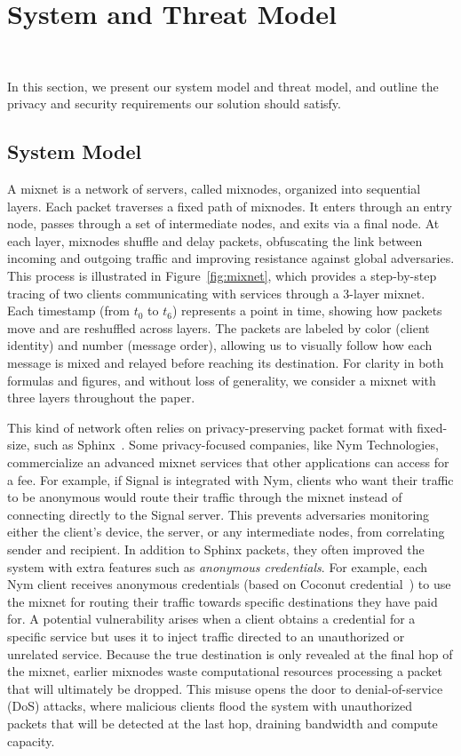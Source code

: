 \section{System and Threat Model}~\label{sec:sys_model}

In this section, we present our system model and threat model, and outline the privacy and security requirements our solution should satisfy.

\subsection{System Model}

A mixnet is a network of servers, called mixnodes, organized into sequential layers. 
Each packet traverses a fixed path of mixnodes. 
It enters through an entry node, passes through a set of intermediate nodes, and exits via a final node. 
At each layer, mixnodes shuffle and delay packets, obfuscating the link between incoming and outgoing traffic and improving resistance against global adversaries.
This process is illustrated in Figure~\ref{fig:mixnet}, which provides a step-by-step tracing of two clients communicating with services through a 3-layer mixnet. 
Each timestamp (from $t_0$ to $t_6$) represents a point in time, showing how packets move and are reshuffled across layers. 
The packets are labeled by color (client identity) and number (message order), allowing us to visually follow how each message is mixed and relayed before reaching its destination.
For clarity in both formulas and figures, and without loss of generality, we consider a mixnet with three layers throughout the paper.

This kind of network often relies on privacy-preserving packet format with fixed-size, such as Sphinx~\cite{sphinx}.
Some privacy-focused companies, like Nym Technologies, commercialize an advanced mixnet services that other applications can access for a fee.
For example, if Signal is integrated with Nym, clients who want their traffic to be anonymous would route their traffic through the mixnet instead of connecting directly to the Signal server. 
This prevents adversaries monitoring either the client's device, the server, or any intermediate nodes, from correlating sender and recipient.
In addition to Sphinx packets, they often improved the system with extra features such as \textit{anonymous credentials}.
For example, each Nym client receives anonymous credentials (based on Coconut credential~\cite{coconut}) to use the mixnet for routing their traffic towards specific destinations they have paid for.
A potential vulnerability arises when a client obtains a credential for a specific service but uses it to inject traffic directed to an unauthorized or unrelated service. 
Because the true destination is only revealed at the final hop of the mixnet, earlier mixnodes waste computational resources processing a packet that will ultimately be dropped. 
This misuse opens the door to denial-of-service (DoS) attacks, where malicious clients flood the system with unauthorized packets that will be detected at the last hop, draining bandwidth and compute capacity.



